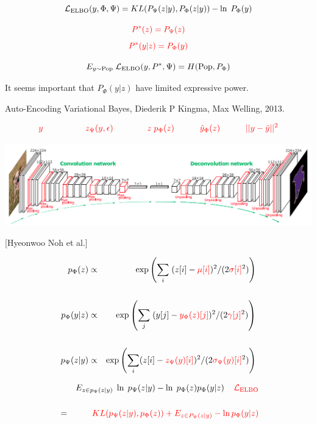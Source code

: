 {$${\cal L}_{\mathrm{ELBO}}(y,\Phi,\Psi) = KL(P_\Psi(z|y),P_{\Phi}(z|y)) - \ln\;P_{\Phi}(y)$$

$${\color{red} P^*(z) = P_\Psi(z)}$$
$${\color{red} P^*(y|z) = P_\Phi(y)}$$

$$E_{y \sim \mathrm{Pop}}\;{\cal L}_{\mathrm{ELBO}}(y,P^*,\Psi) = H(\mathrm{Pop},P_\Phi)$$

\vfill
It seems important that $P_\Phi(y|z)$ have limited expressive power.



Auto-Encoding Variational Bayes, Diederik P Kingma, Max Welling, 2013.

\vfill
$${\color{red}y \hspace{5em}  z_\Psi(y,\epsilon) \hspace{4em} z\;p_\Phi(z) \hspace{3em} \hat{y}_\Phi(z) \hspace{3em}||y - \hat{y}||^2}$$
\centerline{\includegraphics[width=9in]{../images/Deconv}}

\centerline{\Large [Hyeonwoo Noh et al.]}


\begin{eqnarray*}
p_\Phi(z) & \propto & \exp\left(\sum_i \;(z[i] - {\color{red} \mu[i]})^2/(2{\color{red} \sigma[i]}^2)\right) \\
\\
p_\Phi(y|z) & \propto & \exp\left(\sum_j\;(y[j] - {\color{red} y_\Phi(z)[j]})^2/(2{\color{red} \gamma[j]}^2)\right) \\
\\
p_\Psi(z|y) & \propto & \exp\left(\sum_i (z[i] - {\color{red} z_\Psi(y)[i]})^2/(2{\color{red} \sigma_\Psi(y)[i]}^2)\right)
\end{eqnarray*}


\begin{eqnarray*}
&  & E_{z \in p_\Psi(z|y)}\;\ln\;p_\Psi(z|y) - \ln\;p_\Phi(z)p_\Phi(y|z) \;\;\;\;{\color{red} {\cal L}_{\mathrm{ELBO}}} \\
\\
& = & {\color{red}  KL(p_\Psi(z|y),p_\Phi(z)) + E_{z \in P_\Psi(z|y)} - \ln p_\Phi(y|z)}
\end{eqnarray*}

}
